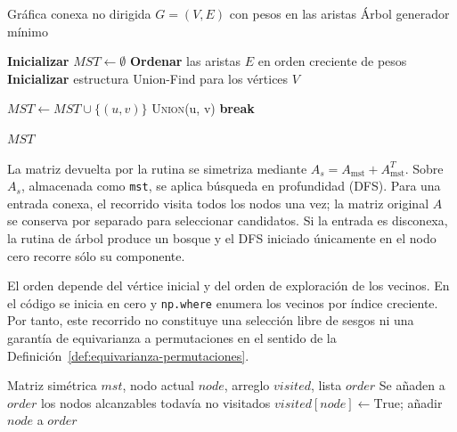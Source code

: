 \begin{algorithm}[H]
\caption{Algoritmo de Kruskal para el árbol generador mínimo}
\label{alg:kruskal}
\begin{algorithmic}[1]
\Require Gráfica conexa no dirigida \( G = (V, E) \) con pesos en las aristas
\Ensure Árbol generador mínimo

\State \textbf{Inicializar} \( MST \gets \emptyset \) 
\State \textbf{Ordenar} las aristas \( E \) en orden creciente de pesos
\State \textbf{Inicializar} estructura Union-Find para los vértices \( V \)

     
        \State \( MST \gets MST \cup \{(u, v)\} \) 
        \State \textsc{Union}(u, v) 
    \EndIf
     
        \State \textbf{break}
    \EndIf
\EndFor

\State \Return \( MST \) 
\end{algorithmic}
\end{algorithm}

La matriz devuelta por la rutina se simetriza mediante $A_s=A_{\mathrm{mst}}+A_{\mathrm{mst}}^T$. Sobre $A_s$, almacenada como \texttt{mst}, se aplica búsqueda en profundidad (DFS). Para una entrada conexa, el recorrido visita todos los nodos una vez; la matriz original $A$ se conserva por separado para seleccionar candidatos. Si la entrada es disconexa, la rutina de árbol produce un bosque y el DFS iniciado únicamente en el nodo cero recorre sólo su componente.

El orden depende del vértice inicial y del orden de exploración de los vecinos. En el código se inicia en cero y \texttt{np.where} enumera los vecinos por índice creciente. Por tanto, este recorrido no constituye una selección libre de sesgos ni una garantía de equivarianza a permutaciones en el sentido de la Definición~\ref{def:equivarianza-permutaciones}.

\begin{algorithm}[H]
\caption{Recorrido en profundidad del árbol auxiliar}
\label{alg:DFS}
\begin{algorithmic}[1]
\Require Matriz simétrica $mst$, nodo actual $node$, arreglo $visited$, lista $order$
\Ensure Se añaden a $order$ los nodos alcanzables todavía no visitados
    \State $visited[node]\gets\text{True}$; añadir $node$ a $order$
            \State {}
        \EndIf
    \EndFor
\EndFunction
\end{algorithmic}
\end{algorithm}

